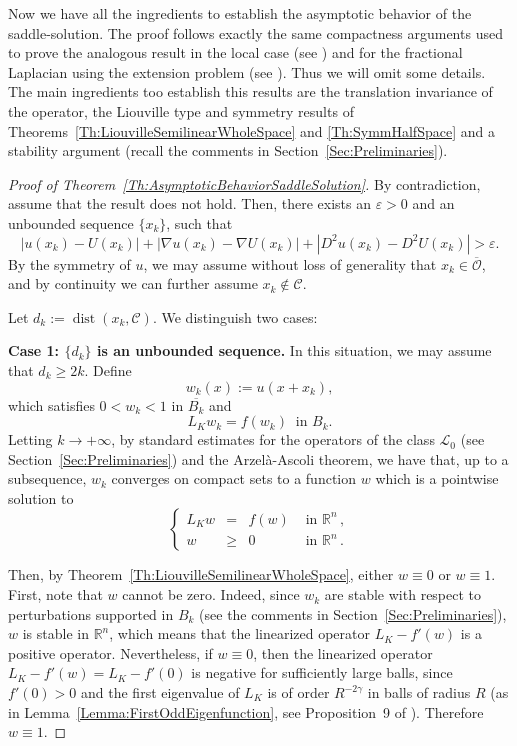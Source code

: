 \documentclass[12pt,reqno]{amsart}
\theoremstyle{definition}
\theoremstyle{remark}
\newcommand{\con}[1]{\mathbb{#1}}
\newcommand{\R}{\con{R}} %
\newcommand{\ccal}{\mathscr{C}}
\newcommand{\lcal}{\mathcal{L}}
\newcommand{\ocal}{\mathcal{O}}
\newcommand{\s}{\gamma}
\newcommand\beqc[1]{\left\{\begin{array}{#1}}
\newcommand\eeqc{\end{array} \right.}
\def\PDEsystem{rcll}
\DeclareMathOperator{\dist}{dist}
\numberwithin{equation}{section}
\begin{document}
Now we have all the ingredients to establish the asymptotic behavior of the saddle-solution. The proof follows exactly the same compactness arguments used to prove the analogous result in the local case (see \cite{CabreTerraII}) and for the fractional Laplacian using the extension problem (see \cite{Cinti-Saddle, Cinti-Saddle2}). Thus we will omit some details. The main ingredients too establish this results are the translation invariance of the operator, the Liouville type and symmetry results of Theorems~\ref{Th:LiouvilleSemilinearWholeSpace} and \ref{Th:SymmHalfSpace} and a stability argument (recall the comments in Section~\ref{Sec:Preliminaries}). 



\begin{proof}[Proof of Theorem~\ref{Th:AsymptoticBehaviorSaddleSolution}]
	By contradiction, assume that the result does not hold. Then, there exists an $\varepsilon>0$ and an unbounded sequence $\{x_k\}$, such that
	\begin{equation}
	\label{Eq:ContradictionAsymptotic}
	|u(x_k)-U(x_k)|+|\nabla u(x_k)-\nabla U(x_k)|+|D^2u(x_k)-D^2U(x_k)| > \varepsilon.
	\end{equation}
	By the symmetry of $u$, we may assume without loss of generality that $x_k \in \overline{\ocal}$, and by continuity we can further assume $ x_k \notin \ccal$. 
	
	Let $d_k:=\dist(x_k,\ccal)$. We distinguish two cases:
	
	\textbf{Case 1: $\{d_k\}$ is an unbounded sequence.} In this situation, we may assume that $d_k \geq 2k$. Define
	$$
	w_k(x) := u(x+x_k), 
	$$
	which satisfies $0<w_k<1$ in $\overline{B_k}$ and
	$$
	L_K w_k = f(w_k) \ \textrm{ in } B_k.
	$$
	Letting $k\to +\infty$, by standard estimates for the operators of the class $\lcal_0$ (see Section~\ref{Sec:Preliminaries}) and the Arzelà-Ascoli theorem, we have that, up to a subsequence, $w_k$ converges on compact sets to a function $w$ which is a pointwise solution to
	$$
	\beqc{\PDEsystem}
	L_K  w &=& f(w) & \textrm{ in }\R^n\,,\\
	w &\geq& 0 & \textrm{ in } \R^n\,.
	\eeqc
	$$
	
	Then, by Theorem~\ref{Th:LiouvilleSemilinearWholeSpace}, either $w\equiv 0$ or $w\equiv 1$. First, note that $w$ cannot be zero. Indeed, since $w_k$ are stable with respect to perturbations supported in $B_k$ (see the comments in Section~\ref{Sec:Preliminaries}), $w$ is stable in $\R^n$, which means that the linearized operator $L_K-f'(w)$ is a positive operator. Nevertheless, if $w\equiv 0$, then the linearized operator $L_K-f'(w) = L_K-f'(0)$ is negative for sufficiently large balls, since $f'(0)>0$ and the first eigenvalue of $L_K$ is of order $R^{-2\s}$ in balls of radius $R$ (as in Lemma~\ref{Lemma:FirstOddEigenfunction}, see Proposition~9 of \cite{ServadeiValdinoci}). Therefore $w\equiv 1$. 
	

\end{proof}
\end{document}

